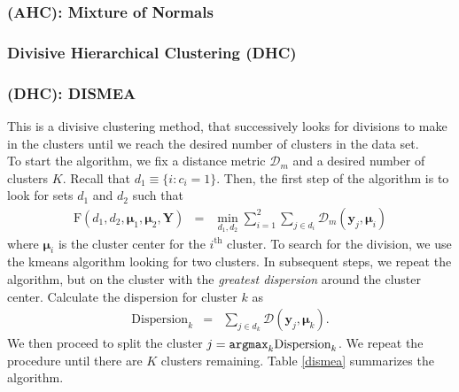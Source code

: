 \documentclass[11pt,letterpaper]{article}
\numberwithin{equation}{section}
\begin{document}
\subsubsection{(AHC): Mixture of Normals}
\subsubsection{Divisive Hierarchical Clustering (DHC)}
\subsubsection{(DHC): DISMEA}
This is a divisive clustering method, that successively looks for
divisions to make in the clusters until we reach the desired number
of clusters in the data set.  \\
\indent To start the algorithm, we fix a distance metric
$\mathcal{D}_m$ and a desired number of clusters $K$.  Recall that
$d_1 \equiv \{i: c_i = 1\}$.  Then, the first step of the algorithm
is to look for sets $d_1$ and $d_2$ such that
\begin{eqnarray}
\text{F}(d_1, d_2,\boldsymbol{\mu}_1, \boldsymbol{\mu}_2,
\boldsymbol{Y}) & = & \min_{d_1, d_2} \sum_{i=1}^{2} \sum_{j \in
d_i} \mathcal{D}_m (\boldsymbol{y}_j, \boldsymbol{\mu}_i) \nonumber
\end{eqnarray}
where $\boldsymbol{\mu}_i$ is the cluster center for the
$i^{\text{th}}$ cluster.  To search for the division, we use the
kmeans algorithm looking for two clusters.  In subsequent steps, we
repeat the algorithm, but on the cluster with the \emph{greatest
dispersion} around the cluster center.  Calculate the dispersion for
cluster $k$ as
\begin{eqnarray}
\text{Dispersion}_k & = & \sum_{j \in d_k}
\mathcal{D}(\boldsymbol{y}_j, \boldsymbol{\mu}_k). \nonumber
\end{eqnarray}
We then proceed to split the cluster $j = {\tt arg max}_k
\text{Dispersion}_k$.  We repeat the procedure until there are $K$
clusters remaining.  Table \ref{dismea} summarizes the algorithm.
\begin{table}[hbt!]
\caption{DISMEA algorithm} \label{dismea} 
\end{table}
\end{document}
